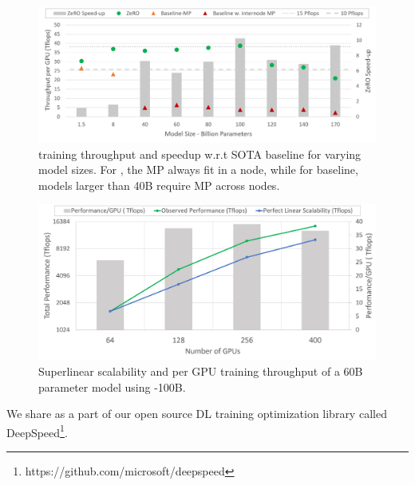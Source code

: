 \begin{figure}[t!]
 \begin{center}
 \includegraphics[width=1.0\columnwidth]{model_size_and_speedup.PNG}
 \caption{\name training throughput and speedup w.r.t SOTA baseline for varying model sizes.  For \name, the MP always fit in a node, while for baseline, models larger than 40B require MP across nodes.} 
 \label{fig:billion_parameter_speedup}
 \end{center}
 \end{figure}

\begin{figure}[t!]
 \begin{center}
 \includegraphics[width=1.0\columnwidth]{hyperscale_60B_model_v2.PNG}
 \caption{Superlinear scalability and per GPU training throughput of a 60B parameter model using \name-100B.} 
 \label{fig:hyperscale_60B}
 \end{center}
 \end{figure}

We share \name as a part of our open source DL training optimization library called DeepSpeed\footnote{https://github.com/microsoft/deepspeed}.